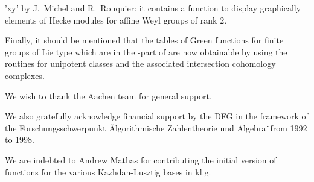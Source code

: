 'xy'  by  J.~Michel  and  R.~Rouquier:  it  contains  a function to display
graphically elements of Hecke modules for affine Weyl groups of rank 2.

Finally,  it should  be mentioned  that the  tables of  Green functions for
finite  groups of Lie type which are  in the {\MAPLE}-part of {\CHEVIE} are
now  obtainable by using  the {\CHEVIE} routines  for unipotent classes and
the associated intersection cohomology complexes.

 We  wish to thank  the Aachen {\GAP} team
for general support.

We  also  gratefully  acknowledge  financial  support  by  the  DFG  in the
framework  of the Forschungsschwerpunkt  \"Algorithmische Zahlentheorie und
Algebra\"\ from 1992 to 1998.

We  are indebted to  Andrew Mathas for  contributing the initial version of
functions for the various Kazhdan-Lusztig bases in kl.g.

